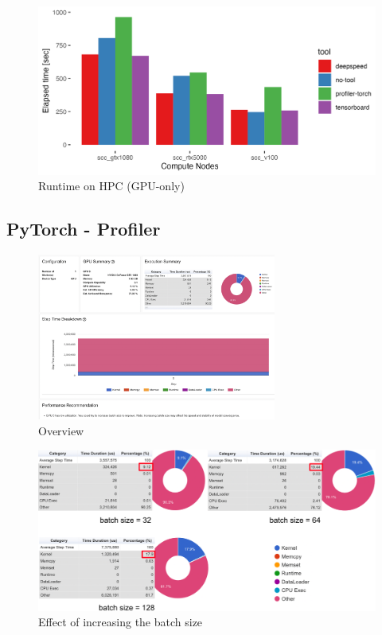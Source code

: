 \documentclass[12pt, a4paper, hidelinks]{article}
\begin{document}
\begin{figure}[H]
\centering
\includegraphics[width=1\textwidth]{./assets/sacct_barplot_by_nodes_no-experiment_gpu}
\caption*{Runtime on HPC (GPU-only)}
\label{fig:sacct_barplot_by_nodes_no-experiment_gpu}
\end{figure}

\subsection{PyTorch - Profiler}
\label{sec:r-pytorch-profiler}

\begin{figure}[H]
\centering
\includegraphics[width=0.7\textwidth]{./assets/scap_gtx1080_profiler-torch_14650076}
\caption*{Overview}
\label{fig:scap_gtx1080_profiler-torch_14650076}
\end{figure}

\begin{figure}[H]
\centering
\includegraphics[width=1\textwidth]{./assets/scap_gtx1080_profiler-torch_comparison-batch-size}
\caption*{Effect of increasing the batch size}
\label{fig:scap_gtx1080_profiler-torch_comparison-batch-size}
\end{figure}
\end{document}
